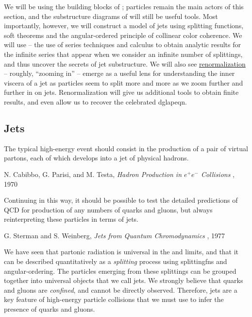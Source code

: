 We will be using the building blocks of ;
%
particles remain the main actors of this section, and the substructure diagrams of \Sec{} will still be useful tools.
%
Most importantly, however, we will construct a model of jets using splitting functions, soft theorems and the angular-ordered principle of collinear color coherence.
%
%
We will use  -- the use of series techniques and calculus to obtain analytic results for the infinite series that appear when we consider an infinite number of splittings, and thus uncover the secrets of jet substructure.
%
We will also see \underline{renormalization} -- roughly, ``zooming in'' -- emerge as a useful lens for understanding the inner viscera of a jet as particles seem to split more and more as we zoom further and further in on jets.
%
Renormalization will give us additional tools to obtain finite results, and even allow us to recover the celebrated \gls{dglapeqn}.





\subsection{Jets}
\label{sec:jet-intro}

\epigraph{The typical high-energy event should consist in the production of a pair of virtual partons, each of which develops into a jet of physical hadrons.}{N. Cabibbo, G. Parisi, and M. Testa, \textit{Hadron Production in \(e^+ e^-\) Collisions} \cite{Cabibbo:1970mh}, 1970}

\epigraph{Continuing in this way, it should be possible to test the detailed predictions of QCD for production of any numbers of quarks and gluons, but always reinterpreting
these particles in terms of jets.}{G. Sterman and S. Weinberg, \textit{Jets from Quantum Chromodynamics} \cite{Sterman:1977wj}, 1977}


We have seen that partonic radiation is universal in the  and  limits, and that it can be described quantitatively as a \textit{splitting} process using \glspl{splittingfn} and \gls{angular-ordering}.
%
The particles emerging from these splittings can be grouped together into universal objects that we call jets.
%
We strongly believe that quarks and gluons are \textit{confined}, and cannot be directly observed.
%
Therefore, jets are a key feature of high-energy particle collisions that we must use to infer the presence of quarks and gluons.

